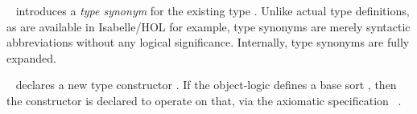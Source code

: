 \begin{isabellebody}
\begin{isamarkuptext}
\begin{description}
  \item \hyperlink{command.type-synonym}{\mbox{}}~
  introduces a \emph{type synonym}  for the
  existing type .  Unlike actual type definitions, as are
  available in Isabelle/HOL for example, type synonyms are merely
  syntactic abbreviations without any logical significance.
  Internally, type synonyms are fully expanded.
  
  \item \hyperlink{command.typedecl}{\mbox{}}~ declares a new
  type constructor .  If the object-logic defines a base sort
  , then the constructor is declared to operate on that, via
  the axiomatic specification \hyperlink{command.arities}{\mbox{}}~.


\end{description}
\end{isamarkuptext}
\end{isabellebody}
